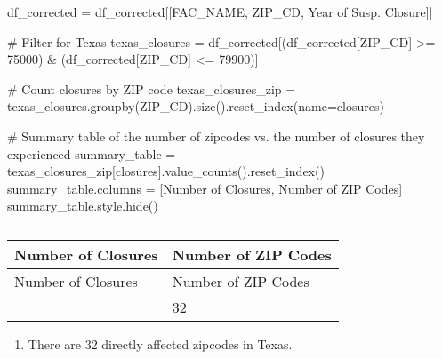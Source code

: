 \documentclass[
  letterpaper,
  DIV=11,
  numbers=noendperiod]{scrartcl}
\newenvironment{Shaded}{\begin{snugshade}}{\end{snugshade}}
\newcommand{\CommentTok}[1]{\textcolor[rgb]{0.37,0.37,0.37}{#1}}
\newcommand{\DecValTok}[1]{\textcolor[rgb]{0.68,0.00,0.00}{#1}}
\newcommand{\NormalTok}[1]{\textcolor[rgb]{0.00,0.23,0.31}{#1}}
\newcommand{\OperatorTok}[1]{\textcolor[rgb]{0.37,0.37,0.37}{#1}}
\newcommand{\StringTok}[1]{\textcolor[rgb]{0.13,0.47,0.30}{#1}}
\providecommand{\tightlist}{%
  \setlength{\itemsep}{0pt}\setlength{\parskip}{0pt}}\usepackage{longtable,booktabs,array}
\begin{document}
\begin{Shaded}
\begin{Highlighting}[]
\NormalTok{df\_corrected }\OperatorTok{=}\NormalTok{ df\_corrected[[}\StringTok{\textquotesingle{}FAC\_NAME\textquotesingle{}}\NormalTok{, }\StringTok{\textquotesingle{}ZIP\_CD\textquotesingle{}}\NormalTok{, }\StringTok{\textquotesingle{}Year of Susp. Closure\textquotesingle{}}\NormalTok{]]}

\CommentTok{\# Filter for Texas}
\NormalTok{texas\_closures }\OperatorTok{=}\NormalTok{ df\_corrected[(df\_corrected[}\StringTok{\textquotesingle{}ZIP\_CD\textquotesingle{}}\NormalTok{] }\OperatorTok{\textgreater{}=} \DecValTok{75000}\NormalTok{) }\OperatorTok{\&}\NormalTok{ (df\_corrected[}\StringTok{\textquotesingle{}ZIP\_CD\textquotesingle{}}\NormalTok{] }\OperatorTok{\textless{}=} \DecValTok{79900}\NormalTok{)]}

\CommentTok{\# Count closures by ZIP code}
\NormalTok{texas\_closures\_zip }\OperatorTok{=}\NormalTok{ texas\_closures.groupby(}\StringTok{\textquotesingle{}ZIP\_CD\textquotesingle{}}\NormalTok{).size().reset\_index(name}\OperatorTok{=}\StringTok{\textquotesingle{}closures\textquotesingle{}}\NormalTok{)}

\CommentTok{\# Summary table of the number of zipcodes vs. the number of closures they experienced}
\NormalTok{summary\_table }\OperatorTok{=}\NormalTok{ texas\_closures\_zip[}\StringTok{\textquotesingle{}closures\textquotesingle{}}\NormalTok{].value\_counts().reset\_index()}
\NormalTok{summary\_table.columns }\OperatorTok{=}\NormalTok{ [}\StringTok{\textquotesingle{}Number of Closures\textquotesingle{}}\NormalTok{, }\StringTok{\textquotesingle{}Number of ZIP Codes\textquotesingle{}}\NormalTok{]}
\NormalTok{summary\_table.style.hide()}
\end{Highlighting}
\end{Shaded}

\begin{longtable}[]{@{}ll@{}}
\caption{}\label{T_9ae67}\tabularnewline
\toprule\noalign{}
Number of Closures & Number of ZIP Codes \\
\midrule\noalign{}
\endfirsthead
\toprule\noalign{}
Number of Closures & Number of ZIP Codes \\
\midrule\noalign{}
\endhead
\bottomrule\noalign{}
\endlastfoot
1 & 32 \\
\end{longtable}

\begin{enumerate}
\def\labelenumi{\arabic{enumi}.}
\setcounter{enumi}{1}
\tightlist
\item
  There are 32 directly affected zipcodes in Texas.
\end{enumerate}
\end{document}
